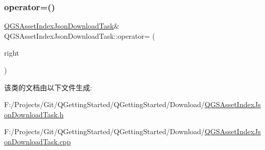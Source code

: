 \subsubsection{\texorpdfstring{operator=()}{operator=()}\hspace{0.1cm}{\footnotesize\ttfamily [2/2]}}
{\footnotesize\ttfamily \mbox{\hyperlink{class_q_g_s_asset_index_json_download_task}{Q\+G\+S\+Asset\+Index\+Json\+Download\+Task}}\& Q\+G\+S\+Asset\+Index\+Json\+Download\+Task\+::operator= (\begin{DoxyParamCaption}\item[{\mbox{\hyperlink{class_q_g_s_asset_index_json_download_task}{Q\+G\+S\+Asset\+Index\+Json\+Download\+Task}} \&\&}]{right }\end{DoxyParamCaption})\hspace{0.3cm}{\ttfamily [delete]}}



该类的文档由以下文件生成\+:\begin{DoxyCompactItemize}
\item 
F\+:/\+Projects/\+Git/\+Q\+Getting\+Started/\+Q\+Getting\+Started/\+Download/\mbox{\hyperlink{_q_g_s_asset_index_json_download_task_8h}{Q\+G\+S\+Asset\+Index\+Json\+Download\+Task.\+h}}\item 
F\+:/\+Projects/\+Git/\+Q\+Getting\+Started/\+Q\+Getting\+Started/\+Download/\mbox{\hyperlink{_q_g_s_asset_index_json_download_task_8cpp}{Q\+G\+S\+Asset\+Index\+Json\+Download\+Task.\+cpp}}\end{DoxyCompactItemize}
